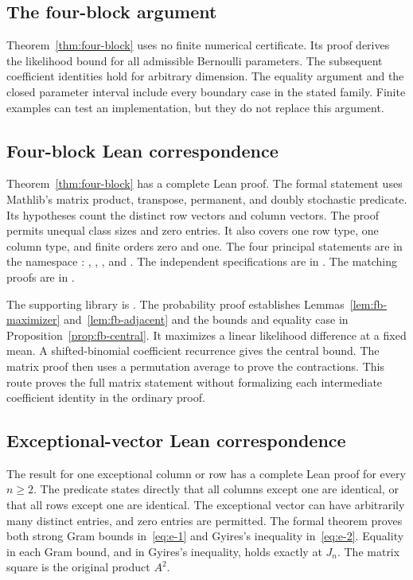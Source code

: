 \documentclass[11pt,a4paper]{article}
\theoremstyle{definition}
\theoremstyle{remark}
\begin{document}
\subsection{The four-block argument}

Theorem~\ref{thm:four-block} uses no finite numerical certificate.
Its proof derives the likelihood bound for all admissible Bernoulli parameters.
The subsequent coefficient identities hold for arbitrary dimension.
The equality argument and the closed parameter interval include every boundary case in the stated family.
Finite examples can test an implementation, but they do not replace this argument.

\subsection{Four-block Lean correspondence}

Theorem~\ref{thm:four-block} has a complete Lean proof.
The formal statement uses Mathlib's matrix product, transpose, permanent, and doubly stochastic predicate.
Its hypotheses count the distinct row vectors and column vectors.
The proof permits unequal class sizes and zero entries.
It also covers one row type, one column type, and finite orders zero and one.
The four principal statements are in the namespace
:
, , , and .
The independent specifications are in
.
The matching proofs are in
.

The supporting library is
.
The probability proof establishes Lemmas~\ref{lem:fb-maximizer} and~\ref{lem:fb-adjacent}
and the bounds and equality case in Proposition~\ref{prop:fb-central}.
It maximizes a linear likelihood difference at a fixed mean.
A shifted-binomial coefficient recurrence gives the central bound.
The matrix proof then uses a permutation average to prove the contractions.
This route proves the full matrix statement without formalizing each intermediate coefficient identity in the ordinary proof.

\subsection{Exceptional-vector Lean correspondence}

The result for one exceptional column or row has a complete Lean proof for every $n\ge2$.
The predicate states directly that all columns except one are identical, or that all rows except one are identical.
The exceptional vector can have arbitrarily many distinct entries, and zero entries are permitted.
The formal theorem proves both strong Gram bounds in~\eqref{eq:e-1} and Gyires's inequality in~\eqref{eq:e-2}.
Equality in each Gram bound, and in Gyires's inequality, holds exactly at $J_n$.
The matrix square is the original product $A^2$.
\end{document}
